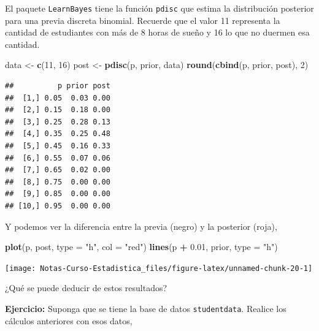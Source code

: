 \documentclass[
  12pt,
]{book}
\newenvironment{Shaded}{\begin{snugshade}}{\end{snugshade}}
\newcommand{\DataTypeTok}[1]{\textcolor[rgb]{0.13,0.29,0.53}{#1}}
\newcommand{\DecValTok}[1]{\textcolor[rgb]{0.00,0.00,0.81}{#1}}
\newcommand{\FloatTok}[1]{\textcolor[rgb]{0.00,0.00,0.81}{#1}}
\newcommand{\KeywordTok}[1]{\textcolor[rgb]{0.13,0.29,0.53}{\textbf{#1}}}
\newcommand{\NormalTok}[1]{#1}
\newcommand{\OperatorTok}[1]{\textcolor[rgb]{0.81,0.36,0.00}{\textbf{#1}}}
\newcommand{\StringTok}[1]{\textcolor[rgb]{0.31,0.60,0.02}{#1}}
\begin{document}
El paquete \texttt{LearnBayes} tiene la función \texttt{pdisc} que estima la distribución posterior para una previa discreta binomial. Recuerde que el valor 11 representa la cantidad de estudiantes con más de 8 horas de sueño y 16 lo que no duermen esa cantidad.

\begin{Shaded}
\begin{Highlighting}[]
\NormalTok{data \textless{}{-}}\StringTok{ }\KeywordTok{c}\NormalTok{(}\DecValTok{11}\NormalTok{, }\DecValTok{16}\NormalTok{)}
\NormalTok{post \textless{}{-}}\StringTok{ }\KeywordTok{pdisc}\NormalTok{(p, prior, data)}
\KeywordTok{round}\NormalTok{(}\KeywordTok{cbind}\NormalTok{(p, prior, post), }\DecValTok{2}\NormalTok{)}
\end{Highlighting}
\end{Shaded}

\begin{verbatim}
##          p prior post
##  [1,] 0.05  0.03 0.00
##  [2,] 0.15  0.18 0.00
##  [3,] 0.25  0.28 0.13
##  [4,] 0.35  0.25 0.48
##  [5,] 0.45  0.16 0.33
##  [6,] 0.55  0.07 0.06
##  [7,] 0.65  0.02 0.00
##  [8,] 0.75  0.00 0.00
##  [9,] 0.85  0.00 0.00
## [10,] 0.95  0.00 0.00
\end{verbatim}

Y podemos ver la diferencia entre la previa (negro) y la posterior (roja),

\begin{Shaded}
\begin{Highlighting}[]
\KeywordTok{plot}\NormalTok{(p, post, }\DataTypeTok{type =} \StringTok{"h"}\NormalTok{, }\DataTypeTok{col =} \StringTok{"red"}\NormalTok{)}
\KeywordTok{lines}\NormalTok{(p }\OperatorTok{+}\StringTok{ }\FloatTok{0.01}\NormalTok{, prior, }\DataTypeTok{type =} \StringTok{"h"}\NormalTok{)}
\end{Highlighting}
\end{Shaded}

\begin{center}\texttt{[image: Notas-Curso-Estadistica\_files/figure-latex/unnamed-chunk-20-1]} \end{center}

¿Qué se puede deducir de estos resultados?

\textbf{Ejercicio:} Suponga que se tiene la base de datos \texttt{studentdata}. Realice los cálculos anteriores con esos datos,

\begin{Shaded}
\end{Shaded}
\end{document}
